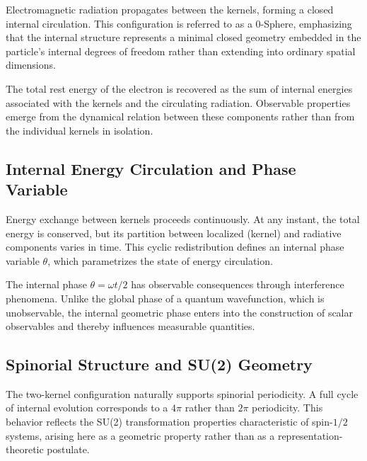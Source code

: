 \documentclass[%
 reprint,
 amsmath,amssymb,
 aps,
 prb,
]{revtex4-2}
\numberwithin{equation}{section}
\begin{document}
Electromagnetic radiation propagates between the kernels, forming a closed internal circulation. This configuration is referred to as a 0-Sphere, emphasizing that the internal structure represents a minimal closed geometry embedded in the particle's internal degrees of freedom rather than extending into ordinary spatial dimensions.

The total rest energy of the electron is recovered as the sum of internal energies associated with the kernels and the circulating radiation. Observable properties emerge from the dynamical relation between these components rather than from the individual kernels in isolation.


\subsection{Internal Energy Circulation and Phase Variable}
\label{subsec:energy_circulation}

Energy exchange between kernels proceeds continuously. At any instant, the total energy is conserved, but its partition between localized (kernel) and radiative components varies in time. This cyclic redistribution defines an internal phase variable $\theta$, which parametrizes the state of energy circulation.

The internal phase $\theta = \omega t/2$ has observable consequences through interference phenomena. Unlike the global phase of a quantum wavefunction, which is unobservable, the internal geometric phase enters into the construction of scalar observables and thereby influences measurable quantities.


\subsection{Spinorial Structure and SU(2) Geometry}
\label{subsec:su2_geometry}

The two-kernel configuration naturally supports spinorial periodicity. A full cycle of internal evolution corresponds to a $4\pi$ rather than $2\pi$ periodicity. This behavior reflects the SU(2) transformation properties characteristic of spin-$1/2$ systems, arising here as a geometric property rather than as a representation-theoretic postulate.
\end{document}
